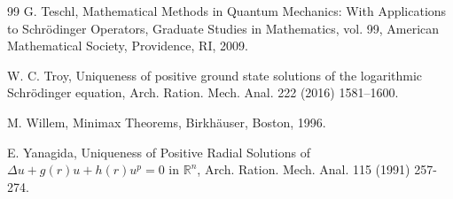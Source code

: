\documentclass{article}
\theoremstyle{definition} \theoremstyle{remark}
\numberwithin{equation}{section}
\newcommand{\R}{\mathbb{R}}
\begin{document}
\begin{thebibliography}{99}
 G. Teschl, Mathematical Methods in Quantum Mechanics: With Applications to Schr\"odinger Operators, Graduate Studies in Mathematics, vol. 99, American Mathematical Society, Providence, RI, 2009.

 W. C.  Troy,   Uniqueness of positive ground state solutions of the logarithmic Schr\"odinger equation, Arch. Ration. Mech. Anal. 222 (2016) 1581–1600.

 M. Willem, Minimax Theorems, Birkh\"auser, Boston, 1996.


  E. Yanagida, Uniqueness of Positive Radial Solutions  of   $\Delta u + g(r)u + h(r)u^p = 0 $ in  $\R^n$,  Arch. Ration. Mech. Anal.  115 (1991) 257-274.

   
    
    
    
    

\end{thebibliography}
\end{document}
